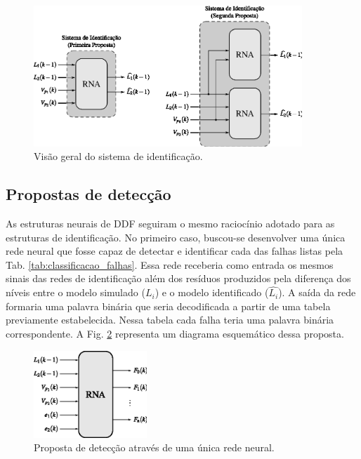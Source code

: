 \begin{figure}[!htb]
\centering
    \includegraphics[width=0.9\textwidth]{imgs/sistema/eps/sist_ident}
    \caption{Visão geral do sistema de identificação.}
    \label{fig:sist_ident}
\end{figure}

\subsection{Propostas de detecção}
As estruturas neurais de DDF seguiram o mesmo raciocínio adotado para as
estruturas de identificação. No primeiro caso, buscou-se desenvolver uma
única rede neural que fosse capaz de detectar e identificar cada das falhas
listas pela Tab. \ref{tab:classificacao_falhas}. Essa rede receberia como
entrada os mesmos sinais das redes de identificação além dos resíduos produzidos
pela diferença dos níveis entre o modelo simulado ($L_i$) e o modelo
identificado ($\widehat{L_i}$). A saída da rede formaria uma palavra binária que
seria decodificada a partir de uma tabela previamente estabelecida. Nessa tabela
cada falha teria uma palavra binária correspondente. A Fig.
\ref{fig:detec_prop_1} representa um diagrama esquemático dessa proposta.

\begin{figure}[!htb]
\centering
    \includegraphics[width=0.38\textwidth]{imgs/sistema/eps/detec_prop_1}
    \caption{Proposta de detecção através de uma única rede neural.}
    \label{fig:detec_prop_1}
\end{figure}


